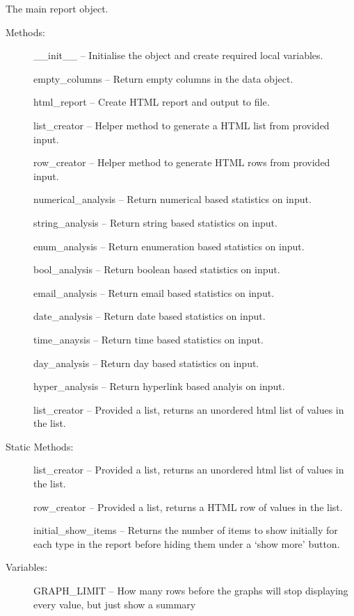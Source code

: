\documentclass[letterpaper,10pt,english]{sphinxmanual}
\begin{document}
\begin{fulllineitems}
\label{Code_rst/rep:report.Report}
The main report object.
\begin{description}
\item[{Methods:}] \leavevmode
\_\_init\_\_ -- Initialise the object and create required local variables.

empty\_columns -- Return empty columns in the data object.

html\_report -- Create HTML report and output to file.

list\_creator -- Helper method to generate a HTML list from provided input.

row\_creator -- Helper method to generate HTML rows from provided input.

numerical\_analysis -- Return numerical based statistics on input.

string\_analysis -- Return string based statistics on input.

enum\_analysis -- Return enumeration based statistics on input.

bool\_analysis -- Return boolean based statistics on input.

email\_analysis -- Return email based statistics on input.

date\_analysis -- Return date based statistics on input.

time\_anaysis -- Return time based statistics on input.

day\_analysis -- Return day based statistics on input.

hyper\_analysis -- Return hyperlink based analyis on input.

list\_creator -- Provided a list, returns an unordered html list of values in the list.

\item[{Static Methods:}] \leavevmode
list\_creator -- Provided a list, returns an unordered html list of values in the list.

row\_creator -- Provided a list, returns a HTML row of values in the list.

initial\_show\_items -- Returns the number of items to show initially for each type in the 
report before hiding them under a `show more' button.

\item[{Variables:}] \leavevmode
GRAPH\_LIMIT -- How many rows before the graphs will stop displaying every value, but just show a summary


\end{description}
\end{fulllineitems}
\end{document}
